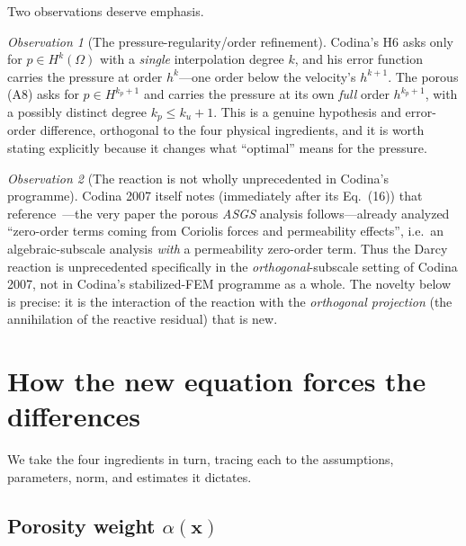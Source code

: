 \documentclass[11pt]{article}
\theoremstyle{remark}
\newtheorem{observation}{Observation}
\begin{document}
Two observations deserve emphasis.

\begin{observation}[The pressure-regularity/order refinement]
Codina's H6 asks only for $p\in H^{k}(\Omega)$ with a \emph{single} interpolation degree
$k$, and his error function carries the pressure at order $h^{k}$---one order below the
velocity's $h^{k+1}$. The porous (A8) asks for $p\in H^{k_p+1}$ and carries the pressure at
its own \emph{full} order $h^{k_p+1}$, with a possibly distinct degree $k_p\le k_u+1$. This
is a genuine hypothesis and error-order difference, orthogonal to the four physical
ingredients, and it is worth stating explicitly because it changes what ``optimal'' means
for the pressure.
\end{observation}

\begin{observation}[The reaction is not wholly unprecedented in Codina's programme]
Codina 2007 itself notes (immediately after its Eq.~(16)) that
reference~\cite{Codina2001}---the very paper the porous \emph{ASGS} analysis
follows---already analyzed ``zero-order terms coming from Coriolis forces and permeability
effects'', i.e.\ an algebraic-subscale analysis \emph{with} a permeability zero-order term.
Thus the Darcy reaction is unprecedented specifically in the \emph{orthogonal}-subscale
setting of Codina 2007, not in Codina's stabilized-FEM programme as a whole. The novelty
below is precise: it is the interaction of the reaction with the \emph{orthogonal
projection} (the annihilation of the reactive residual) that is new.
\end{observation}

\section{How the new equation forces the differences}
\label{sec:forced}

We take the four ingredients in turn, tracing each to the assumptions, parameters, norm,
and estimates it dictates.

\subsection{Porosity weight \texorpdfstring{$\alpha(\boldsymbol x)$}{alpha(x)}}
\label{sec:alpha}
\end{document}

